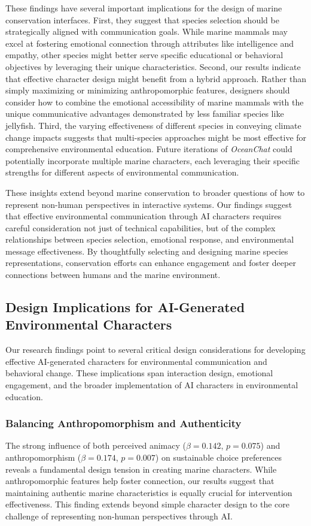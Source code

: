 \documentclass[sigconf, nonacm]{acmart}
\begin{document}
These findings have several important implications for the design of marine conservation interfaces. First, they suggest that species selection should be strategically aligned with communication goals. While marine mammals may excel at fostering emotional connection through attributes like intelligence and empathy, other species might better serve specific educational or behavioral objectives by leveraging their unique characteristics. Second, our results indicate that effective character design might benefit from a hybrid approach. Rather than simply maximizing or minimizing anthropomorphic features, designers should consider how to combine the emotional accessibility of marine mammals with the unique communicative advantages demonstrated by less familiar species like jellyfish. Third, the varying effectiveness of different species in conveying climate change impacts suggests that multi-species approaches might be most effective for comprehensive environmental education. Future iterations of \textit{OceanChat} could potentially incorporate multiple marine characters, each leveraging their specific strengths for different aspects of environmental communication.

These insights extend beyond marine conservation to broader questions of how to represent non-human perspectives in interactive systems. Our findings suggest that effective environmental communication through AI characters requires careful consideration not just of technical capabilities, but of the complex relationships between species selection, emotional response, and environmental message effectiveness. By thoughtfully selecting and designing marine species representations, conservation efforts can enhance engagement and foster deeper connections between humans and the marine environment.

\subsection*{Design Implications for AI-Generated Environmental Characters}

Our research findings point to several critical design considerations for developing effective AI-generated characters for environmental communication and behavioral change. These implications span interaction design, emotional engagement, and the broader implementation of AI characters in environmental education.

\subsubsection*{Balancing Anthropomorphism and Authenticity}
The strong influence of both perceived animacy ($\beta = 0.142$, $p = 0.075$) and anthropomorphism ($\beta = 0.174$, $p = 0.007$) on sustainable choice preferences reveals a fundamental design tension in creating marine characters. While anthropomorphic features help foster connection, our results suggest that maintaining authentic marine characteristics is equally crucial for intervention effectiveness. This finding extends beyond simple character design to the core challenge of representing non-human perspectives through AI.
\end{document}
